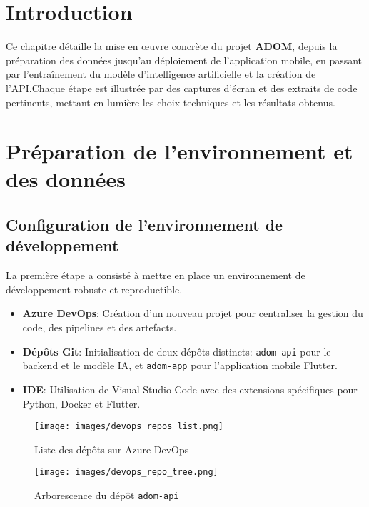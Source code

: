 \documentclass[12pt,a4paper]{report}
\begin{document}
\section{Introduction}
Ce chapitre détaille la mise en œuvre concrète du projet \textbf{ADOM}, depuis la préparation des données jusqu’au déploiement de l’application mobile, en passant par l’entraînement du modèle d’intelligence artificielle et la création de l’API.\@ Chaque étape est illustrée par des captures d’écran et des extraits de code pertinents, mettant en lumière les choix techniques et les résultats obtenus.

\section{Préparation de l’environnement et des données}

\subsection{Configuration de l’environnement de développement}
La première étape a consisté à mettre en place un environnement de développement robuste et reproductible.
\begin{itemize}
    \item \textbf{Azure DevOps}: Création d’un nouveau projet pour centraliser la gestion du code, des pipelines et des artefacts.
    \item \textbf{Dépôts Git}: Initialisation de deux dépôts distincts: \texttt{adom-api} pour le backend et le modèle IA, et \texttt{adom-app} pour l’application mobile Flutter.
    \item \textbf{IDE}: Utilisation de Visual Studio Code avec des extensions spécifiques pour Python, Docker et Flutter.
\end{itemize}

\begin{figure}[H]
    \centering
    \texttt{[image: images/devops\_repos\_list.png]}
    \caption{Liste des dépôts sur Azure DevOps}
\end{figure}

\begin{figure}[H]
    \centering
    \texttt{[image: images/devops\_repo\_tree.png]}
    \caption{Arborescence du dépôt \texttt{adom-api}}
\end{figure}
\end{document}
